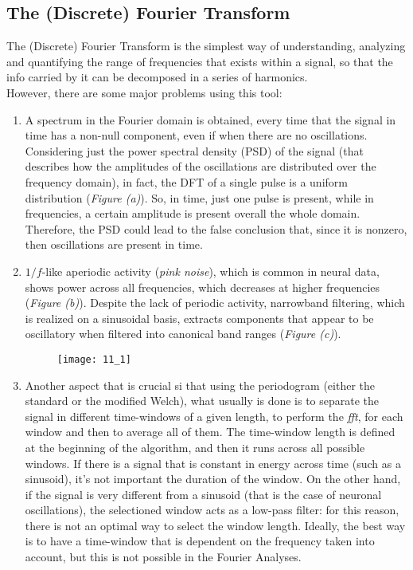 \subsection{The (Discrete) Fourier Transform}
The (Discrete) Fourier Transform is the simplest way of understanding, analyzing and quantifying the range of frequencies that exists within a signal, so that the info carried by it can be decomposed in a series of harmonics.\\
However, there are some major problems using this tool:
\begin{enumerate}
    \item A spectrum in the Fourier domain is obtained, every time that the signal in time has a non-null component, even if when there are no oscillations. Considering just the power spectral density (PSD) of the signal (that describes how the amplitudes of the oscillations are distributed over the frequency domain), in fact, the DFT of a single pulse is a uniform distribution (\textit{Figure (a)}). So, in time, just one pulse is present, while in frequencies, a certain amplitude is present overall the whole domain. Therefore, the PSD could lead to the false conclusion that, since it is nonzero, then oscillations are present in time.
    \item \(1/f\)-like aperiodic activity (\textit{pink noise}), which is common in neural data, shows power across all frequencies, which decreases at higher frequencies (\textit{Figure (b)}). Despite the lack of periodic activity, narrowband filtering, which is realized on a sinusoidal basis, extracts components that appear to be oscillatory when filtered into canonical band ranges (\textit{Figure (c)}).
\begin{figure}[H]
    \texttt{[image: 11\_1]}
    \centering
\end{figure}
    \item Another aspect that is crucial si that using the periodogram (either the standard or the modified Welch), what usually is done is to separate the signal in different time-windows of a given length, to perform the \textit{fft}, for each window and then to average all of them. The time-window length is defined at the beginning of the algorithm, and then it runs across  all possible windows. If there is a signal that is constant in energy across time (such as a sinusoid), it's not important the duration of the window. On the other hand, if the signal is very different from a sinusoid (that is the case of neuronal oscillations), the selectioned window acts as a low-pass filter: for this reason, there is not an optimal way to select the window length. Ideally, the best way is to have a time-window that is dependent on the frequency taken into account, but this is not possible in the Fourier Analyses.
\end{enumerate}

